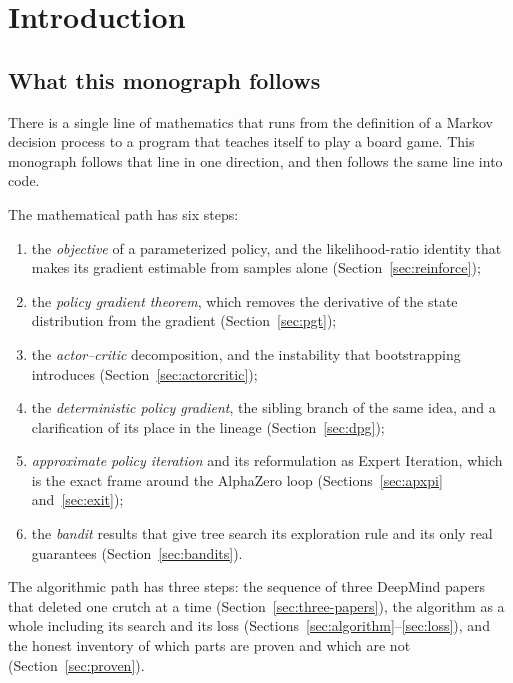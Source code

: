 \section{Introduction}
\label{sec:intro}

\subsection{What this monograph follows}

There is a single line of mathematics that runs from the definition of a
Markov decision process to a program that teaches itself to play a board game.
This monograph follows that line in one direction, and then follows the same
line into code.

The mathematical path has six steps:

\begin{enumerate}
  \item the \emph{objective} of a parameterized policy, and the likelihood-ratio
        identity that makes its gradient estimable from samples alone
        (Section~\ref{sec:reinforce});
  \item the \emph{policy gradient theorem}, which removes the derivative of the
        state distribution from the gradient (Section~\ref{sec:pgt});
  \item the \emph{actor--critic} decomposition, and the instability that
        bootstrapping introduces (Section~\ref{sec:actorcritic});
  \item the \emph{deterministic policy gradient}, the sibling branch of the same
        idea, and a clarification of its place in the lineage
        (Section~\ref{sec:dpg});
  \item \emph{approximate policy iteration} and its reformulation as Expert
        Iteration, which is the exact frame around the AlphaZero loop
        (Sections~\ref{sec:apxpi} and~\ref{sec:exit});
  \item the \emph{bandit} results that give tree search its exploration rule and
        its only real guarantees (Section~\ref{sec:bandits}).
\end{enumerate}

The algorithmic path has three steps: the sequence of three DeepMind papers that
deleted one crutch at a time (Section~\ref{sec:three-papers}), the algorithm as a
whole including its search and its loss
(Sections~\ref{sec:algorithm}--\ref{sec:loss}), and the honest inventory of which
parts are proven and which are not (Section~\ref{sec:proven}).

